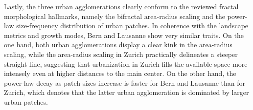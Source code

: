 \documentclass[10pt,letterpaper]{article}
\begin{document}
Lastly, the three urban agglomerations clearly conform to the reviewed fractal morphological hallmarks, namely the bifractal area-radius scaling and the power-law size-frequency distribution of urban patches.
In coherence with the landscape metrics and growth modes, Bern and Lausanne show very similar traits. On the one hand, both urban agglomerations display a clear kink in the area-radius scaling, while the area-radius scaling in Zurich practically delineates a steeper straight line, suggesting that urbanization in Zurich fills the available space more intensely even at higher distances to the main center. On the other hand, the power-law decay as patch sizes increase is faster for Bern and Lausanne than for Zurich, which denotes that the latter urban agglomeration is dominated by larger urban patches.

\end{document}
